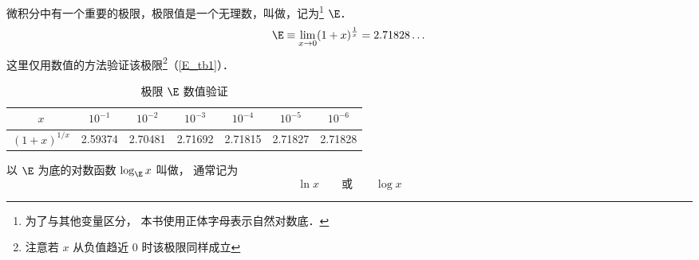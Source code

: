 

微积分中有一个重要的极限，极限值是一个无理数，叫做，记为\footnote{为了与其他变量区分， 本书使用正体字母表示自然对数底．} $\E$．
\begin{equation}\label{E_eq1}
\E \equiv \lim_{x \to 0} (1 + x)^{\frac{1}{x}} = 2.71828\dots
\end{equation}
这里仅用数值的方法验证该极限\footnote{注意若 $x$ 从负值趋近 $0$ 时该极限同样成立}（\autoref{E_tb1}）．

\begin{table}[ht]
\centering
\caption{极限 $\E$ 数值验证}\label{E_tb1}
\begin{tabular}{|c|c|c|c|c|c|c|}
\hline
$x$ & $10^{-1}$ & $10^{-2}$ & $10^{-3}$ & $10^{-4}$ & $10^{-5}$ & $10^{-6}$ \\
\hline
$(1 + x)^{1/x}$ & 2.59374 & 2.70481 & 2.71692 & 2.71815 & 2.71827 & 2.71828 \\
\hline
\end{tabular}
\end{table}


以 $\E$ 为底的对数函数 $\log _{\E} x$ 叫做， 通常记为
\begin{equation}
\ln x \qquad \text{或} \qquad \log x
\end{equation}


